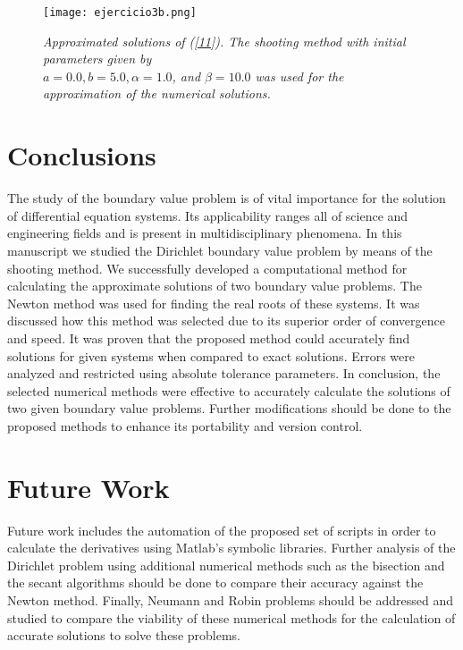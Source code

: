 \documentclass{article}
\begin{document}
\begin{figure}[h!]
    \centering
    \texttt{[image: ejercicio3b.png]}
    \caption{\textit{Approximated solutions of (\ref{11}). The shooting method with initial parameters given by \\ $a = 0.0, b = 5.0, \alpha = 1.0$, and $\beta = 10.0$ was used for the approximation of the numerical solutions.}}
\end{figure}

\section{Conclusions}

The study of the boundary value problem is of vital importance for the solution of differential equation systems. Its applicability ranges all of science and engineering fields and is present in multidisciplinary phenomena. In this manuscript we studied the Dirichlet boundary value problem by means of the shooting method. We successfully developed a computational method for calculating the approximate solutions of two boundary value problems. The Newton method was used for finding the real roots of these systems. It was discussed how this method was selected due to its superior order of convergence and speed. It was proven that the proposed method could accurately find solutions for given systems when compared to exact solutions. Errors were analyzed and restricted using absolute tolerance parameters. In conclusion, the selected numerical methods were effective to accurately calculate the solutions of two given boundary value problems. Further modifications should be done to the proposed methods to enhance its portability and version control.

\section{Future Work}

Future work includes the automation of the proposed set of scripts in order to calculate the derivatives using Matlab's symbolic libraries. Further analysis of the Dirichlet problem using additional numerical methods such as the bisection and the secant algorithms should be done to compare their accuracy against the Newton method. Finally, Neumann and Robin problems should be addressed and studied to compare the viability of these numerical methods for the calculation of accurate solutions to solve these problems.
\end{document}

